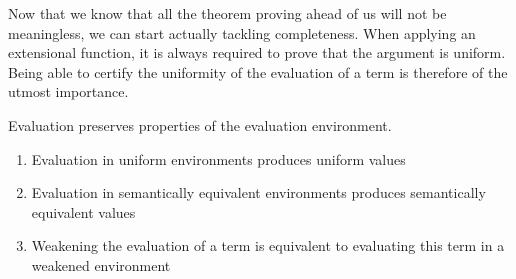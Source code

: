 Now that we know that all the theorem proving ahead of us will not be meaningless,
we can start actually tackling completeness. When applying an extensional function,
it is always required to prove that the argument is uniform. Being able to certify
the uniformity of the evaluation of a term is therefore of the utmost importance.

\begin{lemma} Evaluation preserves properties of the evaluation environment.
\begin{enumerate}
  \item Evaluation in uniform environments produces uniform values
  \item Evaluation in semantically equivalent environments produces semantically equivalent values
  \item Weakening the evaluation of a term is equivalent to evaluating this term in a weakened environment
\end{enumerate}
\end{lemma}

